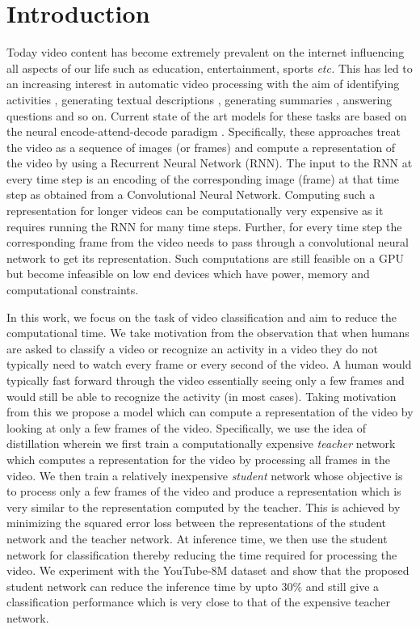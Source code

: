 \documentclass[10pt,twocolumn,letterpaper]{article}
\begin{document}
\section{Introduction}
Today video content has become extremely prevalent on the internet influencing all aspects of our life such as education, entertainment, sports \textit{etc.} This has led to an increasing interest in automatic video processing with the aim of identifying activities \cite{action-recog, video_beyond_short_snippet_classify}, generating textual descriptions \cite{lstm-description}, generating summaries \cite{video_summ}, answering questions \cite{tgif-qa} and so on. Current state of the art models for these tasks are based on the neural encode-attend-decode paradigm \cite{Bahdanau2,Bahdanau}. Specifically, these approaches treat the video as a sequence of images (or frames) and compute a representation of the video by using a Recurrent Neural Network (RNN). The input to the RNN at every time step is an encoding of the corresponding image (frame) at that time step as obtained from a Convolutional Neural Network. Computing such a representation for longer videos can be computationally very expensive as it requires running the RNN for many time steps. Further, for every time step the corresponding frame from the video needs to pass through a convolutional neural network to get its representation. Such computations are still feasible on a GPU but become infeasible on low end devices which have power, memory and computational constraints. 

In this work, we focus on the task of video classification \cite{Youtube8M} and aim to reduce the computational time. We take motivation from the observation that when humans are asked to classify a video or recognize an activity in a video they do not typically need to watch every frame or every second of the video. A human would typically fast forward through the video essentially seeing only a few frames and would still be able to recognize the activity (in most cases). Taking motivation from this we propose a model which can compute a representation of the video by looking at only a few frames of the video. Specifically, we use the idea of distillation wherein we first train a computationally expensive \textit{teacher} network which computes a representation for the video by processing all frames in the video. We then train a relatively inexpensive \textit{student} network whose objective is to process only a few frames of the video and produce a representation which is very similar to the representation computed by the teacher. This is achieved by minimizing the squared error loss between the representations of the student network and the teacher network. At inference time, we then use the student network for classification thereby reducing  the time required for processing the video. We experiment with the YouTube-8M dataset and show that the proposed student network can reduce the inference time by upto $30\%$ and still give a classification performance which is very close to that of the expensive teacher network. 
\end{document}

